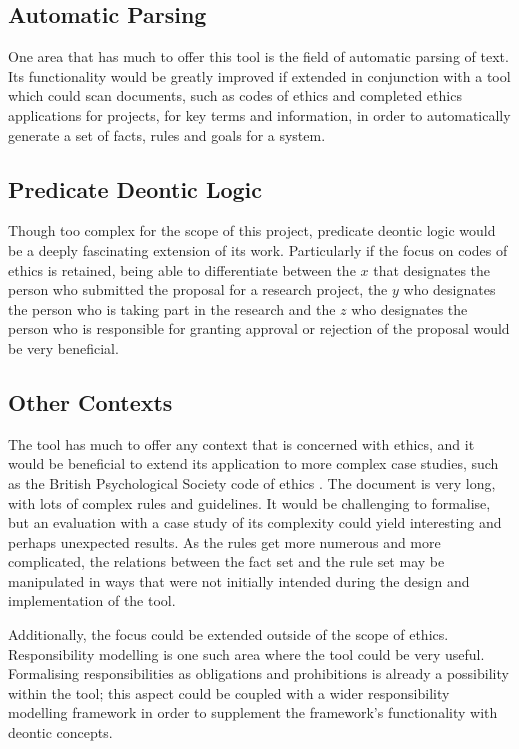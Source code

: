 \documentclass{l4proj}
\begin{document}
\subsection{Automatic Parsing}
One area that has much to offer this tool is the field of automatic parsing of text. Its functionality would be greatly improved if extended in conjunction with a tool which could scan documents, such as codes of ethics and completed ethics applications for projects, for key terms and information, in order to automatically generate a set of facts, rules and goals for a system. 

\subsection{Predicate Deontic Logic}
Though too complex for the scope of this project, predicate deontic logic would be a deeply fascinating extension of its work. Particularly if the focus on codes of ethics is retained, being able to differentiate between the $x$ that designates the person who submitted the proposal for a research project, the $y$ who designates the person who is taking part in the research and the $z$ who designates the person who is responsible for granting approval or rejection of the proposal would be very beneficial. 

\subsection{Other Contexts}
The tool has much to offer any context that is concerned with ethics, and it would be beneficial to extend its application to more complex case studies, such as the British Psychological Society code of ethics \cite{bps_2016}. The document is very long, with lots of complex rules and guidelines. It would be challenging to formalise, but an evaluation with a case study of its complexity could yield interesting and perhaps unexpected results. As the rules get more numerous and more complicated, the relations between the fact set and the rule set may be manipulated in ways that were not initially intended during the design and implementation of the tool. 

Additionally, the focus could be extended outside of the scope of ethics. Responsibility modelling is one such area where the tool could be very useful. Formalising responsibilities as obligations and prohibitions is already a possibility within the tool; this aspect could be coupled with a wider responsibility modelling framework in order to supplement the framework's functionality with deontic concepts. 
\end{document}
